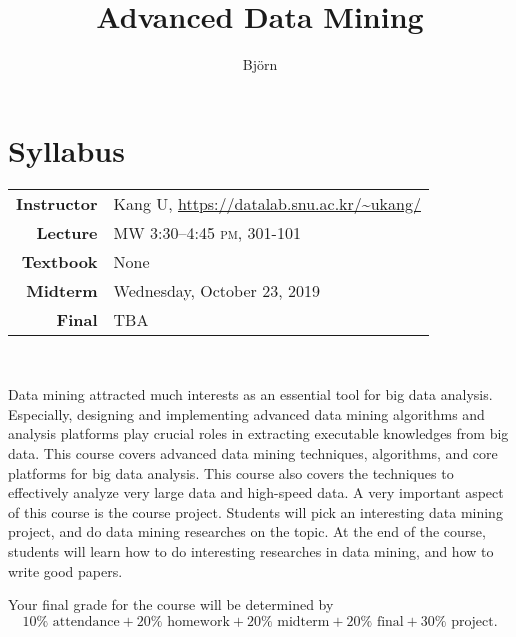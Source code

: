 \documentclass{lnotes}
\title{Advanced Data Mining}
\author{Björn}
\begin{document}
\section*{Syllabus}

\begin{center}
\begin{tabular}{@{}rp{10cm}@{}}
\toprule 
\textbf{Instructor} & Kang U, \url{https://datalab.snu.ac.kr/~ukang/} \\
\textbf{Lecture} & MW 3:30--4:45 \textsc{pm}, 301-101 \\
\textbf{Textbook} & None \\
\textbf{Midterm} & Wednesday, October 23, 2019 \\
\textbf{Final} & TBA \\
\bottomrule 
\end{tabular} \\[3ex]
\end{center}

Data mining attracted much interests as an essential tool for big data analysis. Especially, designing and implementing advanced data mining algorithms and analysis platforms play crucial roles in extracting executable knowledges from big data. This course covers advanced data mining techniques, algorithms, and core platforms for big data analysis. This course also covers the techniques to effectively analyze very large data and high-speed data.
A very important aspect of this course is the course project. Students will pick an interesting data mining project, and do data mining researches on the topic. At the end of the course, students will learn how to do interesting researches in data mining, and how to write good papers.

Your final grade for the course will be determined by
$$
10\% \text{ attendance} + 20\% \text{ homework} + 20\% \text{ midterm} + 20\% \text{ final} + 30\% \text{ project}.
$$

 



\end{document}
